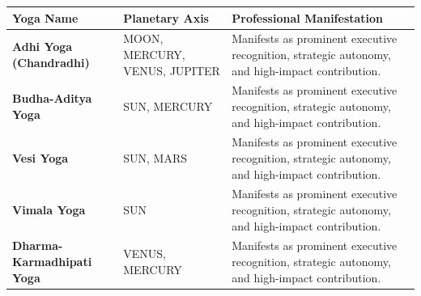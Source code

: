 \begin{executivecard}
  \sffamily\fontsize{8}{11.5}\selectfont
  \begin{tabularx}{\linewidth}{@{}l l X@{}}
    \toprule
    \textbf{Yoga Name} & \textbf{Planetary Axis} & \textbf{Professional Manifestation} \\
    \midrule
    \textbf{Adhi Yoga (Chandradhi)} & MOON, MERCURY, VENUS, JUPITER & Manifests as prominent executive recognition, strategic autonomy, and high-impact contribution. \\
    \textbf{Budha-Aditya Yoga} & SUN, MERCURY & Manifests as prominent executive recognition, strategic autonomy, and high-impact contribution. \\
    \textbf{Vesi Yoga} & SUN, MARS & Manifests as prominent executive recognition, strategic autonomy, and high-impact contribution. \\
    \textbf{Vimala Yoga} & SUN & Manifests as prominent executive recognition, strategic autonomy, and high-impact contribution. \\
    \textbf{Dharma-Karmadhipati Yoga} & VENUS, MERCURY & Manifests as prominent executive recognition, strategic autonomy, and high-impact contribution. \\
    \bottomrule
  \end{tabularx}
\end{executivecard}\vspace{2mm}


